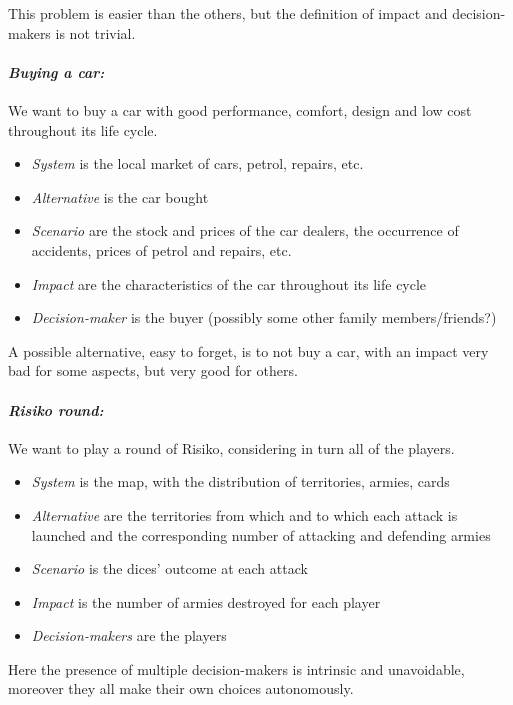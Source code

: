 This problem is easier than the others, but the definition of impact and decision-makers is not trivial.

\paragraph{\textit{Buying a car:}} We want to buy a car with good performance, comfort, design and low cost throughout its life cycle.
\begin{itemize}
	\item \textit{System} is the local market of cars, petrol, repairs, etc.
	
	\item \textit{Alternative} is the car bought 
	
	\item \textit{Scenario} are the stock and prices of the car dealers, the occurrence of accidents, prices of petrol and repairs, etc. 
	
	\item \textit{Impact} are the characteristics of the car throughout its life cycle
	
	\item \textit{Decision-maker} is the buyer (possibly some other family members/friends?)
\end{itemize}

A possible alternative, easy to forget, is to not buy a car, with an impact very bad for some aspects, but very good for others.

\paragraph{\textit{Risiko round:}} We want to play a round of Risiko, considering in turn all of the players.
\begin{itemize}
	\item \textit{System} is the map, with the distribution of territories, armies, cards
	
	\item \textit{Alternative} are the territories from which and to which each attack is launched and the corresponding number of attacking and defending armies
	
	\item \textit{Scenario} is the dices' outcome at each attack
	
	\item \textit{Impact} is the number of armies destroyed for each player
	
	\item \textit{Decision-makers} are the players
\end{itemize}

Here the presence of multiple decision-makers is intrinsic and unavoidable, moreover they all make their own choices autonomously.